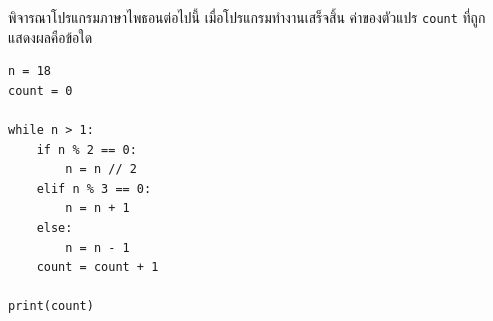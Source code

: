 \question พิจารณาโปรแกรมภาษาไพธอนต่อไปนี้ เมื่อโปรแกรมทำงานเสร็จสิ้น ค่าของตัวแปร \texttt{count} ที่ถูกแสดงผลคือข้อใด
\begin{verbatim}
n = 18
count = 0

while n > 1:
    if n % 2 == 0:
        n = n // 2
    elif n % 3 == 0:
        n = n + 1
    else:
        n = n - 1
    count = count + 1

print(count)
\end{verbatim}
